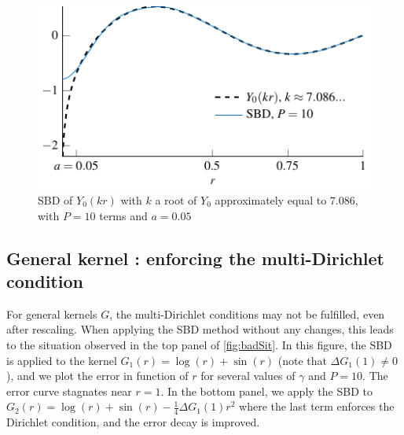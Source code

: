\documentclass{article}
\begin{document}
\begin{figure}[ht]	      	
	\setlength{\plotwidth}{0.7\textwidth}
	\centering	
	\includegraphics[scale = 1]{Y0vsSBD}
	\caption{SBD of $Y_0(kr)$ with $k$ a root of $Y_0$ approximately equal to $7.086$, with $P=10$ terms and $a=0.05$ }	      
	\label{Y0Example}
\end{figure}				


																										
\subsection{General kernel : enforcing the multi-Dirichlet condition}
\label{begal1}
For general kernels $G$, the multi-Dirichlet conditions may not be fulfilled, even after rescaling. When applying the SBD method without any changes, this leads to the situation observed in the top panel of \autoref{fig:badSit}. In this figure, the SBD is applied to the kernel $G_1(r) = \log(r) + \sin(r)$ (note that $\Delta G_1(1) \neq 0$), and we plot the error in function of $r$ for several values of $\gamma$ and $P = 10$. The error curve stagnates near $r=1$. In the bottom panel, we apply the SBD to $G_2(r) = \log(r) + \sin(r) - \frac{1}{4}\Delta G_1(1)r^2$ where the last term enforces the Dirichlet condition, and the error decay is improved. 
\end{document}
